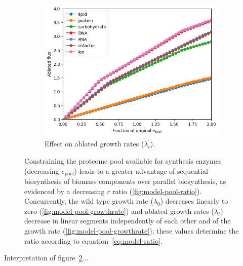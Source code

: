 \begin{figure}
\begin{subfigure}[htpb]{0.45\textwidth}
   \centering
   \includegraphics[width=\textwidth]{epool_ec_components}
   \caption{
     Effect on ablated growth rates ($\lambda_{i}^{\prime}$).
   }
   \label{fig:model-pool-ablated}
  \end{subfigure}
  \caption{
    Constraining the proteome pool available for synthesis enzymes (decreasing $e_{\mathrm{pool}}$) leads to a greater advantage of sequential biosynthesis of biomass components over parallel biosynthesis, as evidenced by a decreasing $r$ ratio (\ref{fig:model-pool-ratio}).
    Concurrently, the wild type growth rate ($\lambda_{0}$) decreases linearly to zero (\ref{fig:model-pool-growthrate}) and ablated growth rates ($\lambda_{i}^{\prime}$) decrease in linear segments independently of each other and of the growth rate (\ref{fig:model-pool-growthrate}); these values determine the ratio according to equation~\ref{eq:model-ratio}.
  }
  \label{fig:model-pool}
\end{figure}


Interpretation of figure~\ref{fig:model-pool}...

